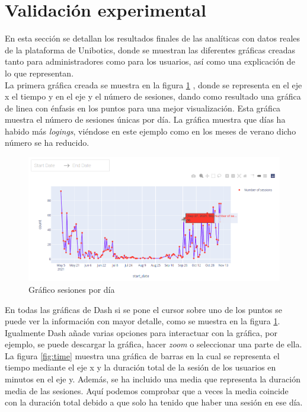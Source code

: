 \section{Validación experimental}

En esta sección se detallan los resultados finales de las analíticas con datos reales de la plataforma de Unibotics, donde se muestran las diferentes gráficas creadas tanto para administradores como para los usuarios, así como una explicación de lo que representan.\\

La primera gráfica creada se muestra en la figura \ref{fig:sesion} , donde se representa en el eje x el tiempo y en el eje y el número de sesiones, dando como resultado una gráfica de linea con énfasis en los puntos para una mejor visualización. Esta gráfica muestra el número de sesiones únicas por día. La gráfica muestra que días ha habido más \textit{logings}, viéndose en este ejemplo como en los meses de verano dicho número se ha reducido.



\begin{figure}[H]
    \centering
    \includegraphics[width=18cm, keepaspectratio]{img/sesion.png}
    \caption{Gráfico sesiones por día}
    \label{fig:sesion}
\end{figure}
En todas las gráficas de Dash si se pone el cursor sobre uno de los puntos se puede ver la información con mayor detalle, como se muestra en la figura \ref{fig:sesion}. Igualmente Dash añade varias opciones para interactuar con la gráfica, por ejemplo, se puede descargar la gráfica, hacer \textit{zoom} o seleccionar una parte de ella. 
\newpage
La figura \ref{fig:time} muestra una gráfica de barras en la cual se representa el tiempo mediante el eje x y la duración total de la sesión de los usuarios en minutos en el eje y. Además, se ha incluido una media que representa la duración media de las sesiones. Aquí podemos comprobar que a veces la media coincide con la duración total debido a que solo ha tenido que haber una sesión en ese día.



